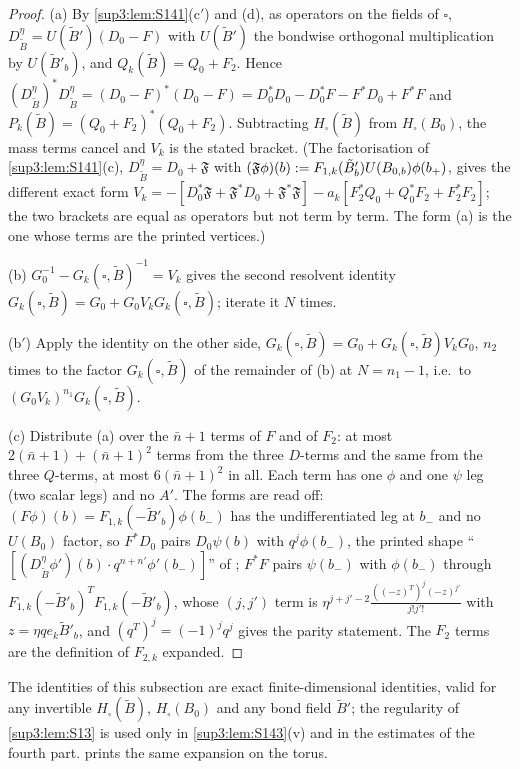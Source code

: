 \begin{proof}
(a) By \cref{sup3:lem:S141}(c$'$) and (d), as operators on the fields of $\square$, $D^\eta_{\tilde B}=U(\tilde B')(D_0-F)$ with $U(\tilde B')$ the bondwise orthogonal multiplication by $U(\tilde B'_b)$, and $Q_k(\tilde B)=Q_0+F_2$. Hence $(D^\eta_{\tilde B})^*D^\eta_{\tilde B}=(D_0-F)^*(D_0-F)=D_0^*D_0-D_0^*F-F^*D_0+F^*F$ and $P_k(\tilde B)=(Q_0+F_2)^*(Q_0+F_2)$. Subtracting $H_\square(\tilde B)$ from $H_\square(B_0)$, the mass terms cancel and $V_k$ is the stated bracket. (The factorisation of \cref{sup3:lem:S141}(c), $D^\eta_{\tilde B}=D_0+\mathfrak F$ with $(\mathfrak F\phi)(b):= F_{1,k}(\tilde B'_b)U(B_{0,b})\phi(b_+)$, gives the different exact form $V_k=-[D_0^*\mathfrak F+\mathfrak F^*D_0+\mathfrak F^*\mathfrak F]-a_k[F_2^*Q_0+Q_0^*F_2+F_2^*F_2]$; the two brackets are equal as operators but not term by term. The form (a) is the one whose terms are the printed vertices.)

(b) $G_0^{-1}-G_k(\square,\tilde B)^{-1}=V_k$ gives the second resolvent identity $G_k(\square,\tilde B)=G_0+G_0V_kG_k(\square,\tilde B)$; iterate it $N$ times.

(b$'$) Apply the identity on the other side, $G_k(\square,\tilde B)=G_0+G_k(\square,\tilde B)V_kG_0$, $n_2$ times to the factor $G_k(\square,\tilde B)$ of the remainder of (b) at $N=n_1-1$, i.e.\ to $(G_0V_k)^{n_1}G_k(\square,\tilde B)$.

(c) Distribute (a) over the $\bar n+1$ terms of $F$ and of $F_2$: at most $2(\bar n+1)+(\bar n+1)^2$ terms from the three $D$-terms and the same from the three $Q$-terms, at most $6(\bar n+1)^2$ in all. Each term has one $\phi$ and one $\psi$ leg (two scalar legs) and no $A'$. The forms are read off: $(F\phi)(b)=F_{1,k}(-\tilde B'_b)\phi(b_-)$ has the undifferentiated leg at $b_-$ and no $U(B_0)$ factor, so $F^*D_0$ pairs $D_0\psi(b)$ with $q^j\phi(b_-)$, the printed shape ``$[(D^\eta_{\tilde B}\phi')(b)\cdot q^{n+n'}\phi'(b_-)]$'' of \cite[p.~413]{Ba3}; $F^*F$ pairs $\psi(b_-)$ with $\phi(b_-)$ through $F_{1,k}(-\tilde B'_b)^TF_{1,k}(-\tilde B'_b)$, whose $(j,j')$ term is $\eta^{j+j'-2}\frac{((-z)^T)^j(-z)^{j'}}{j!j'!}$ with $z=\eta qe_k\tilde B'_b$, and $(q^T)^j=(-1)^jq^j$ gives the parity statement. The $F_2$ terms are the definition of $F_{2,k}$ expanded.
\end{proof}

\begin{remark}\label{sup3:rem:S14a}
The identities of this subsection are exact finite-dimensional identities, valid for any invertible $H_\square(\tilde B)$, $H_\square(B_0)$ and any bond field $\tilde B'$; the regularity of \cref{sup3:lem:S13} is used only in \cref{sup3:lem:S143}(v) and in the estimates of the fourth part. \cite[(3.47)--(3.53)]{K1} prints the same expansion on the torus.
\end{remark}
